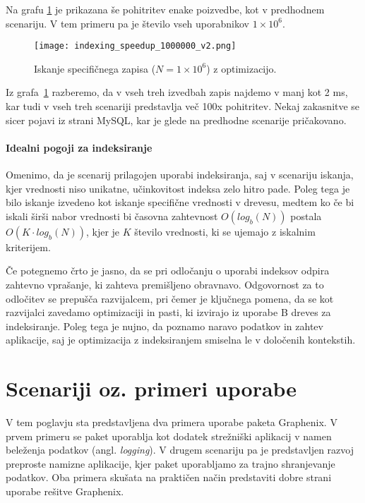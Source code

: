 \documentclass[a4paper,12pt,openright]{book}
\begin{document}
    Na grafu \ref{idx_speedup_2} je prikazana še pohitritev enake poizvedbe, kot v predhodnem scenariju. V tem primeru pa je število vseh uporabnikov $1 \times 10^6$.
    
    \begin{figure}[H]
        \centerline{\texttt{[image: indexing\_speedup\_1000000\_v2.png]}}
        \caption{Iskanje specifičnega zapisa ($N = 1 \times 10^6$) z optimizacijo.}
        \label{idx_speedup_2}
    \end{figure}

    \noindent
    Iz grafa~\ref{idx_speedup_2} razberemo, da v vseh treh izvedbah zapis najdemo v manj kot 2 ms, kar tudi v vseh treh scenariji predstavlja več 100x pohitritev. Nekaj zakasnitve se sicer pojavi iz strani MySQL, kar je glede na predhodne scenarije pričakovano.

    \subsubsection{Idealni pogoji za indeksiranje}
    Omenimo, da je scenarij prilagojen uporabi indeksiranja, saj v scenariju iskanja, kjer vrednosti niso unikatne, učinkovitost indeksa zelo hitro pade. Poleg tega je bilo iskanje izvedeno kot iskanje specifične vrednosti v drevesu, medtem ko če bi iskali širši nabor vrednosti bi časovna zahtevnost $O(log_b(N))$ postala $O(K \cdot log_b(N))$, kjer je $K$ število vrednosti, ki se ujemajo z iskalnim kriterijem.

    Če potegnemo črto je jasno, da se pri odločanju o uporabi indeksov odpira zahtevno vprašanje, ki zahteva premišljeno obravnavo. Odgovornost za to odločitev se prepušča razvijalcem, pri čemer je ključnega pomena, da se kot razvijalci zavedamo optimizaciji in pasti, ki izvirajo iz uporabe B dreves za indeksiranje. Poleg tega je nujno, da poznamo naravo podatkov in zahtev aplikacije, saj je optimizacija z indeksiranjem smiselna le v določenih kontekstih.

\chapter{Scenariji oz. primeri uporabe}
\label{ch3}

    V tem poglavju sta predstavljena dva primera uporabe paketa Graphenix. V prvem primeru se paket uporablja kot dodatek strežniški aplikacij v namen beleženja podatkov (angl. \textit{logging}). V drugem scenariju pa je predstavljen razvoj preproste namizne aplikacije, kjer paket uporabljamo za trajno shranjevanje podatkov. Oba primera skušata na praktičen način predstaviti dobre strani uporabe rešitve Graphenix.
\end{document}
